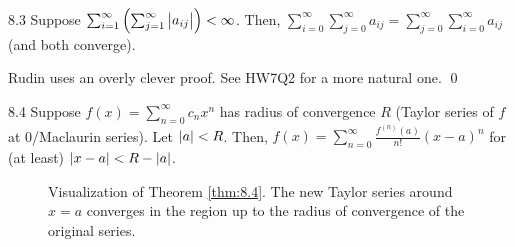 \begin{theorem}{}{8.3}
    Suppose $\sum_{i=1}^\infty \left(\sum_{j=1}^\infty \abs{a_{ij}}\right) < \infty$. Then, $\sum_{i=0}^\infty \sum_{j=0}^\infty a_{ij} = \sum_{j=0}^\infty \sum_{i=0}^\infty a_{ij}$ (and both converge).
\end{theorem}
\begin{nproof}
    Rudin uses an overly clever proof. See HW7Q2 for a more natural one. \qed
\end{nproof}

\begin{theorem}{}{8.4}
    Suppose $f(x) = \sum_{n=0}^\infty c_nx^n$ has radius of convergence $R$ (Taylor series of $f$ at 0/Maclaurin series). Let $\abs{a} < R$. Then, $f(x) = \sum_{n=0}^\infty \frac{f^{(n)}(a)}{n!}(x-a)^n$ for (at least) $\abs{x - a} < R - \abs{a}$. 
\end{theorem}
\begin{figure}[htbp]
    \centering
    
    \caption{Visualization of Theorem \ref{thm:8.4}. The new Taylor series around $x = a$ converges in the region up to the radius of convergence of the original series.}
    \label{fig51}
\end{figure}


